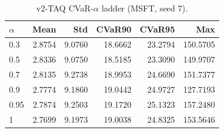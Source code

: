 \begin{table}[H]
    \centering
    \caption{v2-TAQ CVaR-$\alpha$ ladder (MSFT, seed 7).}
    \label{tab:v2_taq_alpha}
    \begin{tabular}{@{}lrrrrr@{}}
        \toprule
        $\alpha$ & Mean & Std & CVaR90 & CVaR95 & Max \\
        \midrule
        0.3 & 2.8754 & 9.0760 & 18.6662 & 23.2794 & 150.5705 \\
        0.5 & 2.8336 & 9.0750 & 18.5185 & 23.3090 & 149.9707 \\
        0.7 & 2.8135 & 9.2738 & 18.9953 & 24.6690 & 151.7377 \\
        0.9 & 2.7774 & 9.1860 & 19.0442 & 24.9727 & 127.7193 \\
        0.95 & 2.7874 & 9.2503 & 19.1720 & 25.1323 & 157.2480 \\
        1 & 2.7699 & 9.1973 & 19.0038 & 24.8325 & 153.5646 \\
        \bottomrule
    \end{tabular}
\end{table}
